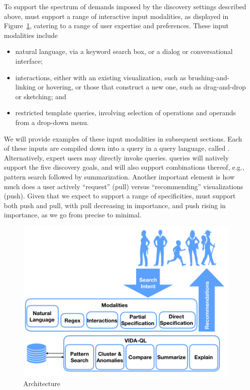\par
{} To support the spectrum of 
demands imposed by the
discovery settings described above, \vida 
must support a range of interactive input modalities,
as displayed in Figure~\ref{fig:cycle},
catering to a range of user expertise and preferences.
These input modalities include 
\begin{itemize}
	\item natural language, via a keyword search box, or a dialog or conversational interface;
	\item interactions, either with an existing visualization, such as brushing-and-linking or hovering, or those that construct a new one, such as drag-and-drop or sketching; and
	\item restricted template queries, involving selection of operations and operands from a drop-down menu.
\end{itemize}
We will provide examples of these input modalities in subsequent sections.
Each of these inputs are compiled down
into a query in a query language, called \vidaql.
Alternatively, expert users may directly invoke \vidaql queries.
\vidaql queries will natively support the five discovery goals,
and will also support combinations thereof, e.g., pattern search followed by 
summarization. 
Another important element is how much does a user actively ``request'' (pull)
versus \vida ``recommending'' visualizations (push). 
Given that we expect \vida to support a range of specificities,
\vida must support both push and pull, with pull decreasing
in importance, and push rising in importance, as we go from precise to minimal.

\begin{figure}[h!]
\label{fig:cycle}
\centering
\includegraphics[width=0.5\linewidth]{figures/VIDA_architecture.png}
\caption{\vida Architecture}
\end{figure}



